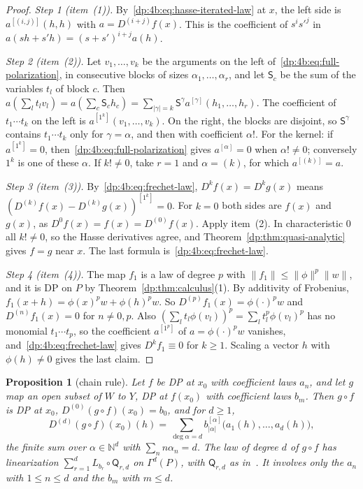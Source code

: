 \documentclass[11pt]{amsart}
\newtheorem{proposition}[theorem]{Proposition}
\theoremstyle{definition}
\theoremstyle{remark}
\numberwithin{equation}{section}
\newcommand{\N}{\mathbb N}
\newcommand{\abs}[1]{\lvert #1\rvert}
\newcommand{\norm}[1]{\lVert #1\rVert}
\theoremstyle{plain}
\theoremstyle{definition}
\theoremstyle{plain}
\begin{document}
\begin{proof}
\emph{Step 1 (item~(1)).} By~\eqref{dp:4b:eq:hasse-iterated-law} at $x$, the left side is $a^{[(i,j)]}(h,h)$ with $a=D^{(i+j)}f(x)$. This is the coefficient of $s^is'^j$ in $a(sh+s'h)=(s+s')^{i+j}a(h)$.

\emph{Step 2 (item~(2)).} Let $v_1,\dots,v_k$ be the arguments on the left of~\eqref{dp:4b:eq:full-polarization}, in consecutive blocks of sizes $\alpha_1,\dots,\alpha_r$, and let $\mathsf S_c$ be the sum of the variables $t_l$ of block $c$. Then $a(\sum_lt_lv_l)=a(\sum_c\mathsf S_ch_c)=\sum_{\abs\gamma=k}\mathsf S^\gamma a^{[\gamma]}(h_1,\dots,h_r)$. The coefficient of $t_1\cdots t_k$ on the left is $a^{[1^k]}(v_1,\dots,v_k)$. On the right, the blocks are disjoint, so $\mathsf S^\gamma$ contains $t_1\cdots t_k$ only for $\gamma=\alpha$, and then with coefficient $\alpha!$. For the kernel: if $a^{[1^k]}=0$, then~\eqref{dp:4b:eq:full-polarization} gives $a^{[\alpha]}=0$ when $\alpha!\ne0$; conversely $1^k$ is one of these $\alpha$. If $k!\ne0$, take $r=1$ and $\alpha=(k)$, for which $a^{[(k)]}=a$.

\emph{Step 3 (item~(3)).} By~\eqref{dp:4b:eq:frechet-law}, $D^kf(x)=D^kg(x)$ means $(D^{(k)}f(x)-D^{(k)}g(x))^{[1^k]}=0$. For $k=0$ both sides are $f(x)$ and $g(x)$, as $D^0f(x)=f(x)=D^{(0)}f(x)$. Apply item~(2). In characteristic $0$ all $k!\ne0$, so the Hasse derivatives agree, and Theorem~\ref{dp:thm:quasi-analytic} gives $f=g$ near $x$. The last formula is~\eqref{dp:4b:eq:frechet-law}.

\emph{Step 4 (item~(4)).} The map $f_1$ is a law of degree $p$ with $\norm{f_1}\le\norm\phi^p\norm w$, and it is DP on $P$ by Theorem~\ref{dp:thm:calculus}(1). By additivity of Frobenius, $f_1(x+h)=\phi(x)^pw+\phi(h)^pw$. So $D^{(p)}f_1(x)=\phi(\cdot)^pw$ and $D^{(n)}f_1(x)=0$ for $n\ne0,p$. Also $(\sum_lt_l\phi(v_l))^p=\sum_lt_l^p\phi(v_l)^p$ has no monomial $t_1\cdots t_p$, so the coefficient $a^{[1^p]}$ of $a=\phi(\cdot)^pw$ vanishes, and~\eqref{dp:4b:eq:frechet-law} gives $D^kf_1\equiv0$ for $k\ge1$. Scaling a vector $h$ with $\phi(h)\ne0$ gives the last claim.
\end{proof}

\begin{proposition}[chain rule]\label{dp:prop:chain-rule}
Let $f$ be DP at $x_0$ with coefficient laws $a_n$, and let $g$ map an open subset of $W$ to $Y$, DP at $f(x_0)$ with coefficient laws $b_m$. Then $g\circ f$ is DP at $x_0$, $D^{(0)}(g\circ f)(x_0)=b_0$, and for $d\ge1$,
\begin{equation}\label{dp:4b:eq:chain-rule}
 D^{(d)}(g\circ f)(x_0)(h)=\sum_{\deg\alpha=d}b_{\abs\alpha}^{[\alpha]}\bigl(a_1(h),\dots,a_d(h)\bigr),
\end{equation}
the finite sum over $\alpha\in\N^d$ with $\sum_nn\alpha_n=d$. The law of degree $d$ of $g\circ f$ has linearization $\sum_{r=1}^dL_{b_r}\circ\mathsf Q_{r,d}$ on $\Gamma^d(P)$, with $\mathsf Q_{r,d}$ as in~\cite[Lemma~Q.4]{I}. It involves only the $a_n$ with $1\le n\le d$ and the $b_m$ with $m\le d$.
\end{proposition}
\end{document}
